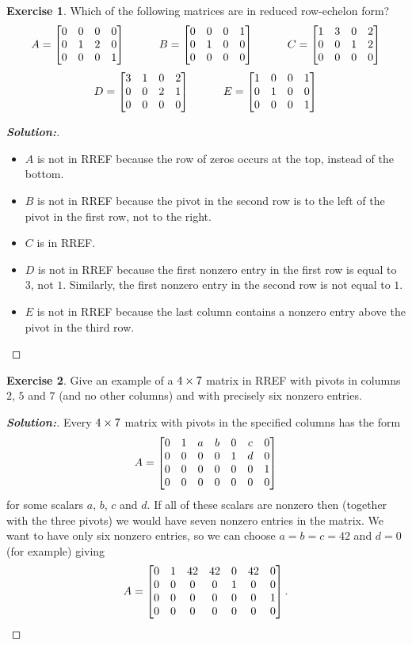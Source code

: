 \documentclass[a4paper]{amsart}
\theoremstyle{definition}
\newtheorem{exercise}{Exercise}
\newenvironment{solution}{\begin{proof}[\textbf{Solution:}] \vphantom{u}}{\end{proof}}
\begin{document}
\begin{exercise}\label{ex-which-rref-i}
 Which of the following matrices are in reduced row-echelon form?
 \[ 
  A = \left[\begin{matrix} 0&0&0&0 \\ 0&1&2&0 \\ 0&0&0&1 \end{matrix}\right] \hspace{3em}
  B = \left[\begin{matrix} 0&0&0&1 \\ 0&1&0&0 \\ 0&0&0&0 \end{matrix}\right] \hspace{3em}
  C = \left[\begin{matrix} 1&3&0&2 \\ 0&0&1&2 \\ 0&0&0&0 \end{matrix}\right]
 \] \[
  D = \left[\begin{matrix} 3&1&0&2 \\ 0&0&2&1 \\ 0&0&0&0 \end{matrix}\right] \hspace{3em}
  E = \left[\begin{matrix} 1&0&0&1 \\ 0&1&0&0 \\ 0&0&0&1 \end{matrix}\right]
 \]
\end{exercise}
\begin{solution}
 \begin{itemize}
  \item $A$ is not in RREF because the row of zeros occurs at the top,
   instead of the bottom.
  \item $B$ is not in RREF because the pivot in the second row is to
   the left of the pivot in the first row, not to the right.
  \item $C$ is in RREF.
  \item $D$ is not in RREF because the first nonzero entry in the
   first row is equal to $3$, not $1$.  Similarly, the first nonzero
   entry in the second row is not equal to $1$.
  \item $E$ is not in RREF because the last column contains a nonzero
   entry above the pivot in the third row.
 \end{itemize}
\end{solution}

\begin{exercise}\label{ex-rref-eg-i}
 Give an example of a $4\times 7$ matrix in RREF with pivots in columns
 $2$, $5$ and $7$ (and no other columns) and with precisely six
 nonzero entries.
\end{exercise}
\begin{solution}
 Every $4\times 7$ matrix with pivots in the specified columns has the
 form 
 \[ A = 
    \left[\begin{matrix} 0 & 1 & a & b & 0 & c & 0 \\
         0 & 0 & 0 & 0 & 1 & d & 0 \\
         0 & 0 & 0 & 0 & 0 & 0 & 1 \\
         0 & 0 & 0 & 0 & 0 & 0 & 0 \end{matrix}\right]
 \]
 for some scalars $a$, $b$, $c$ and $d$.  If all of these scalars are
 nonzero then (together with the three pivots) we would have seven
 nonzero entries in the matrix.  We want to have only six nonzero
 entries, so we can choose $a=b=c=42$ and $d=0$ (for example) giving 
 \[ A = 
    \left[\begin{matrix} 0 & 1 & 42 & 42 & 0 & 42 & 0 \\
         0 & 0 &  0 &  0 & 1 &  0 & 0 \\
         0 & 0 &  0 &  0 & 0 &  0 & 1 \\
         0 & 0 &  0 &  0 & 0 &  0 & 0 \end{matrix}\right].
 \]
\end{solution}
\end{document}

